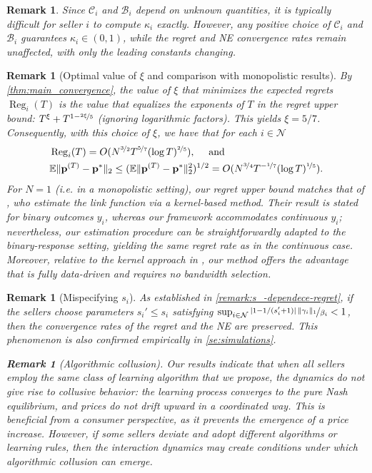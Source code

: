 \documentclass{article} %
\newtheorem{remark}[theorem]{Remark}
\begin{document}
\begin{remark}
Since $\mathscr{C}_i$ and $\mathscr{B}_i$ depend on unknown quantities, it is typically difficult for seller $i$ to compute $\kappa_i$ exactly. However, any positive choice of $\mathscr{C}_i$ and $\mathscr{B}_i$ guarantees $\kappa_i \in (0,1)$, while the regret and NE convergence rates remain unaffected, with only the leading constants changing.
\end{remark}

\begin{remark}[Optimal value of $\xi$ and comparison with monopolistic results]\label{cor:main_convergence}
By \cref{thm:main_convergence}, the value of $\xi$ that minimizes the expected regrets $\operatorname{Reg}_i(T)$ is the value that equalizes the exponents of $T$ in the regret upper bound: $T^{\xi} + T^{1-\nicefrac{2\xi}{5}}$ (ignoring logarithmic factors). This yields $\xi = 5/7$. Consequently, with this choice of $\xi$, we have  that for each $i \in \mathcal{N}$
\begin{align*}
&\operatorname{Reg}_i(T) = O (N^{\nicefrac{3}{2}}T^{\nicefrac{5}{7}}(\log T)^{\nicefrac{2}{5}}),\quad  \text{ and }\\
&
\mathbb{E}\|\mathbf{p}^{(T)}-\mathbf{p}^*\|_2 \leq ( \mathbb{E}\|\mathbf{p}^{(T)}-\mathbf{p}^*\|_2^2)^{1/2} = O(N ^{\nicefrac{3}{4}}T ^{-\nicefrac{1}{7}}(\log T)^{\nicefrac{1}{5}}).
\end{align*}
For \(N=1\) (i.e. in a monopolistic setting), our regret upper bound matches that of \cite{fan2024policy}, who estimate the link function via a kernel-based method. Their result is stated for binary outcomes \(y_i\), whereas our framework accommodates continuous \(y_i\); nevertheless, our estimation procedure can be straightforwardly adapted to the binary-response setting, yielding the same regret rate as in the continuous case. Moreover, relative to the kernel approach in \cite{fan2024policy}, our method offers the advantage that is fully data-driven and requires no bandwidth selection.
\end{remark}

\begin{remark}[Mispecifying $s_i$]
As established in \cref{remark:s_-dependece-regret}, if the sellers choose parameters $s_i' \le s_i$ satisfying $\sup_{i\in\mathcal{N}} \nicefrac{|1 - 1/(s_i'+1)|\,\|\gamma_i\|_1}{\beta_i} < 1$, then the convergence rates of the regret and the NE are preserved. This phenomenon is also confirmed empirically in \cref{se:simulations}.

\begin{remark}[Algorithmic collusion]
Our results indicate that when all sellers employ the same class of learning algorithm that we propose, the dynamics do not give rise to collusive behavior: the learning process converges to the pure Nash equilibrium, and prices do not drift upward in a coordinated way. This is beneficial from a consumer perspective, as it prevents the emergence of a price increase. However, if some sellers deviate and adopt different algorithms or learning rules, then the interaction dynamics may create conditions under which algorithmic collusion can emerge.
\end{remark}

\end{remark}
\end{document}

